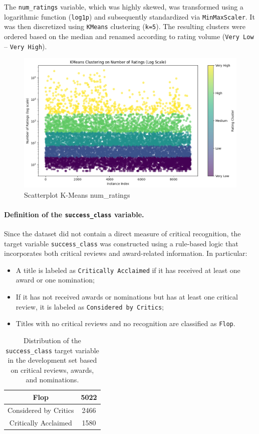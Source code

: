 \documentclass{article}
\begin{document}
The \texttt{num\_ratings} variable, which was highly skewed, was transformed using a logarithmic function (\texttt{log1p}) and subsequently standardized via \texttt{MinMaxScaler}. It was then discretized using \texttt{KMeans} clustering (\texttt{k=5}). The resulting clusters were ordered based on the median and renamed according to rating volume (\texttt{Very Low} -- \texttt{Very High}).

\begin{figure}[H]
    \centering
    \includegraphics[width=0.5\linewidth]{Kmeans_num_rating.png}
    \caption{Scatterplot K-Means num\_ratings}
    \label{fig:enter-label}
\end{figure}


\paragraph{Definition of the \texttt{success\_class} variable.}

Since the dataset did not contain a direct measure of critical recognition, the target variable \texttt{success\_class} was constructed using a rule-based logic that incorporates both critical reviews and award-related information. In particular:
\begin{itemize}
  \item A title is labeled as \texttt{Critically Acclaimed} if it has received at least one award or one nomination;
  \item If it has not received awards or nominations but has at least one critical review, it is labeled as \texttt{Considered by Critics};
  \item Titles with no critical reviews and no recognition are classified as \texttt{Flop}.
\end{itemize}

\begin{table}[H]
    \centering
    \begin{tabular}{cc}
        Flop & 5022\\
        \hline
        Considered by Critics & 2466 \\
        \hline
        Critically Acclaimed & 1580\\
    \end{tabular}
    \caption{Distribution of the \texttt{success\_class} target variable in the development set based on critical reviews, awards, and nominations.}

    \label{tab:my_label}
\end{table}
\end{document}
